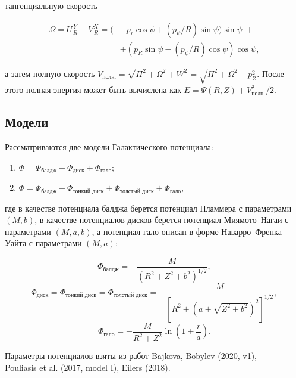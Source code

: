 \documentclass[a4paper, oneside]{article}
\newcommand{\su}{\vspace{-0.5em}}
\begin{document}
тангенциальную скорость

\su
\begin{equation}
\begin{aligned}
  \Omega = U \frac{Y}{R} + V \frac{X}{R} = (& -p_r \cos{\psi} + (p_\psi / R) \sin{\psi}) \sin{\psi} \; + \\
  & + (p_R \sin{\psi} - (p_\psi / R) \cos{\psi}) \cos{\psi},
\end{aligned}
\end{equation}

а затем полную скорость $ V_\text{полн.} = \sqrt{\Pi^2 + \Omega^2 + W^2} = \sqrt{\Pi^2 + \Omega^2 + p_Z^2} $. После этого полная энергия может быть вычислена как $ E = \Psi(R, Z) + V_\text{полн.}^2 / 2 $.

\subsection*{Модели}

Рассматриваются две модели Галактического потенциала:

\begin{enumerate}
  \setlength\itemsep{0.1em}
  \item $ \Phi = \Phi_\text{балдж} + \Phi_\text{диск} + \Phi_\text{гало}; $
  \item $ \Phi = \Phi_\text{балдж} + \Phi_\text{тонкий диск} + \Phi_\text{толстый диск} + \Phi_\text{гало}, $
\end{enumerate}

где в качестве потенциала балджа берется потенциал Пламмера с параметрами $ (M, b) $, в качестве потенциалов дисков берется потенциал Миямото--Нагаи с параметрами $ (M, a, b) $, а потенциал гало описан в форме Наварро--Френка--Уайта с параметрами $ (M, a) $:

\begin{equation}
  \Phi_\text{балдж} = - \frac{M}{(R^2 + Z^2 + b^2)^{1/2}},
\end{equation}
\begin{equation}
  \Phi_\text{диск} = \Phi_\text{тонкий диск} = \Phi_\text{толстый диск} = - \frac{M}{\left[ R^2 + (a + \sqrt{Z^2 + b^2})^2 \right]^{1/2}},
\end{equation}
\begin{equation}
  \Phi_\text{гало} = -\frac{M}{R^2 + Z^2} \ln{\left( 1 + \frac{r}{a} \right)}.
\end{equation}

Параметры потенциалов взяты из работ Bajkova, Bobylev (2020, v1), \\ Pouliasis et al. (2017, model I), Eilers (2018).
\end{document}
